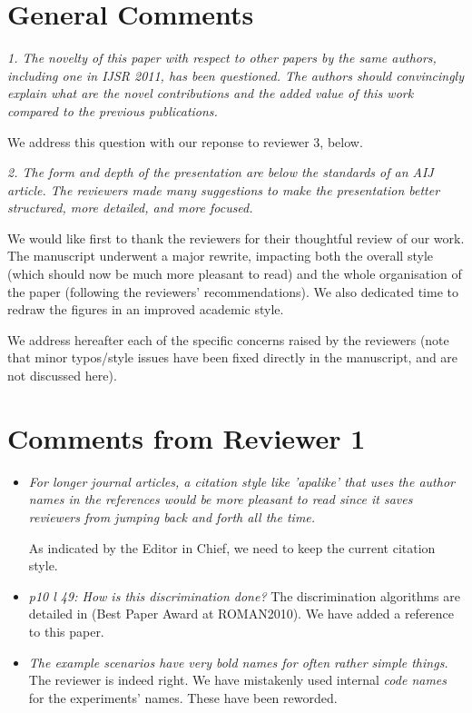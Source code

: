 \documentclass{article}
\begin{document}
\section{General Comments}

\emph{1. The novelty of this paper with respect to other papers by the same
authors, including one in IJSR 2011, has been questioned. The authors should
convincingly explain what are the novel contributions and the added value of
this work compared to the previous publications.}

We address this question with our reponse to reviewer 3, below.

\emph{2. The form and depth of the presentation are below the standards of an
AIJ article.  The reviewers made many suggestions to make the presentation
better structured, more detailed, and more focused.}

We would like first to thank the reviewers for their thoughtful review of our
work. The manuscript underwent a major rewrite, impacting both the overall style
(which should now be much more pleasant to read) and the whole organisation of
the paper (following the reviewers' recommendations). We also dedicated time to
redraw the figures in an improved academic style.

We address hereafter each of the specific concerns raised by the reviewers (note
that minor typos/style issues have been fixed directly in the manuscript, and
are not discussed here).


\section{Comments from Reviewer 1}

\begin{itemize}

    \item \emph{For longer journal articles, a citation style like 'apalike' that uses the
author names in the references would be more pleasant to read since it saves
reviewers from jumping back and forth all the time.}

As indicated by the Editor in Chief, we need to keep the current citation style.

    \item \emph{p10 l 49: How is this discrimination done?} The discrimination
        algorithms are detailed in \cite{Ros2010b} (Best Paper Award at
        ROMAN2010). We have added a reference to this paper.

    \item \emph{The example scenarios have very bold names for often rather
        simple things.} The reviewer is indeed right. We have mistakenly used internal
        \emph{code names} for the experiments' names. These have been reworded.
\end{itemize}
\end{document}
